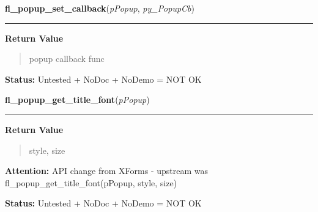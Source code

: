 \hspace{.8\funcindent}\begin{boxedminipage}{\funcwidth}

    \raggedright \textbf{fl\_popup\_set\_callback}(\textit{pPopup}, \textit{py\_PopupCb})

    \vspace{-1.5ex}

    \rule{\textwidth}{0.5\fboxrule}
\setlength{\parskip}{2ex}
\setlength{\parskip}{1ex}
      \textbf{Return Value}
    \vspace{-1ex}

      \begin{quote}
      popup callback func

      \end{quote}

\textbf{Status:} Untested + NoDoc + NoDemo = NOT OK



    \end{boxedminipage}

    \label{xformslib:library:fl_popup_get_title_font}

    \vspace{0.5ex}

\hspace{.8\funcindent}\begin{boxedminipage}{\funcwidth}

    \raggedright \textbf{fl\_popup\_get\_title\_font}(\textit{pPopup})

    \vspace{-1.5ex}

    \rule{\textwidth}{0.5\fboxrule}
\setlength{\parskip}{2ex}
\setlength{\parskip}{1ex}
      \textbf{Return Value}
    \vspace{-1ex}

      \begin{quote}
      style, size

      \end{quote}

\textbf{Attention:} API change from XForms - upstream was fl\_popup\_get\_title\_font(pPopup, 
style, size)



\textbf{Status:} Untested + NoDoc + NoDemo = NOT OK



    \end{boxedminipage}

